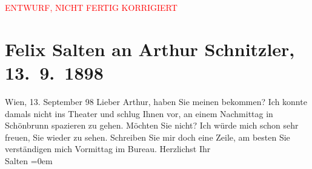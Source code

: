 
\begin{center}
            \textcolor{red}{ENTWURF, NICHT FERTIG KORRIGIERT}
                      \end{center}
            
         \renewcommand{\erwaehnteOrte}{Orte: Schlosspark Schönbrunn, Wien}
         \renewcommand{\erwaehnteWerke}{}
               \section[Felix Salten an Arthur Schnitzler, 13. 9. 1898]{ Felix Salten an Arthur Schnitzler, 13. 9. 1898}\nopagebreak{}\rehead{ }\begin{ledgroupsized}[t]{13cm}\normalsize\beginnumbering \toendnotes[C]{\smallbreak\pagebreak[2]} 
\toendnotes[C]{\smallbreak}\pstart
           \raggedleft{}{\pb}Wien, 13. September 98\pend
           \pstart
           Lieber Arthur, haben Sie meinen \label{K_L03283-1v}\label{K_L03283-1h} bekommen? Ich konnte damals nicht ins Theater und schlug Ihnen vor, an einem
               Nachmittag in Schönbrunn spazieren zu gehen.
               Möchten Sie nicht? Ich würde mich schon sehr freuen, Sie wieder zu sehen. Schreiben
               Sie mir doch eine Zeile, am besten Sie verständigen mich Vormittag im Bureau.\pend
           \pstart
           Herzlichst Ihr {\\[\baselineskip]}\spacefill\mbox{Salten}\pend
           \leftskip=0em{}
         
         \endnumbering{}\end{ledgroupsized}\begin{anhang}\end{anhang}\newcommand{\dateiname}{L03283}\newcommand{\titel}{Felix Salten an Arthur Schnitzler, 13. 9. 1898}\newcommand{\editorInnen}{Martin Anton Müller und Laura Untner}
      